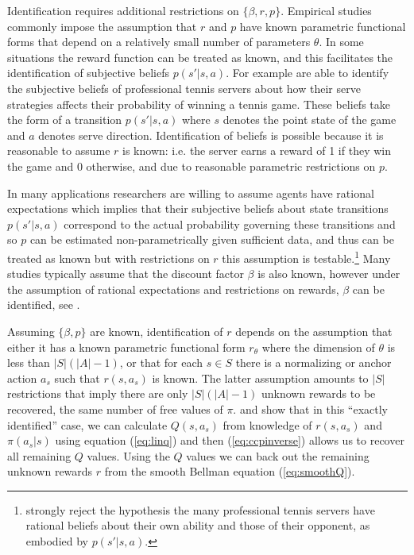 Identification requires additional restrictions on $\{\beta,r,p\}$. 
Empirical studies commonly impose the assumption that $r$ and $p$ have known parametric functional forms that depend on a relatively small number of parameters $\theta$. In some situations the reward function can be treated as
known, and this facilitates the identification of subjective beliefs $p(s'|s,a)$.
For example \citet{tennis:2025} are able to identify the subjective beliefs of professional tennis servers about how their serve
strategies affects their probability of winning a tennis game. These beliefs take the form of a transition $p(s'|s,a)$ where $s$ denotes
the point state of the game and $a$ denotes serve direction. Identification of beliefs is possible  because it is reasonable to assume
$r$ is known: i.e. the server earns a reward of 1 if they win the game and 0 otherwise, and due to reasonable parametric restrictions
on $p$.


In many applications researchers are willing to assume agents have rational expectations 
which implies that their subjective beliefs about state transitions $p(s'|s,a)$ correspond to the actual probability governing
these transitions and so $p$ can be estimated non-parametrically given sufficient data, and thus can be treated as known but
with restrictions on $r$ this assumption is testable.\footnote{\footnotesize
\citet{tennis:2025} strongly reject the hypothesis the many professional tennis servers have rational beliefs about their
own ability and those of their opponent, as embodied by $p(s'|s,a)$.}
Many studies typically assume that the discount factor $\beta$ is also known, however under the assumption of 
rational expectations and restrictions on rewards, $\beta$ can be identified, see \citet{abbringdaljord:2020}.

Assuming $\{\beta,p\}$ are known, identification of $r$ depends on the assumption that either it has a known parametric
functional form $r_\theta$ where the dimension of $\theta$ 
is less than $|S|(|A|-1)$, or that for each $s \in S$ there is
a normalizing or anchor action $a_s$ such that  $r(s,a_s)$ is known. The latter assumption amounts to $|S|$ restrictions
that imply there are only $|S|(|A|-1)$ unknown rewards to be recovered, the same number of free values of $\pi$. 
\citet{hotzmiller:1993} and \citet{kang:2025} show that in this ``exactly identified'' case,
we can calculate $Q(s,a_s)$ from knowledge of $r(s,a_s)$ and $\pi(a_s|s)$ using equation (\ref{eq:linq}) 
and then (\ref{eq:ccpinverse}) allows us to recover all remaining $Q$ values. 
Using the $Q$ values we can back out the remaining unknown rewards $r$ from the smooth Bellman equation (\ref{eq:smoothQ}).

